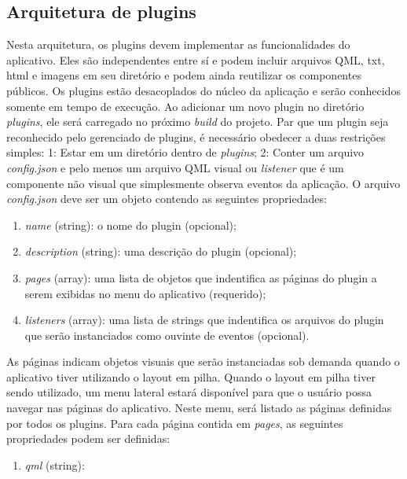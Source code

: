 \subsection{Arquitetura de plugins}
Nesta arquitetura, os plugins devem implementar as funcionalidades do aplicativo. Eles são independentes entre sí e podem incluir arquivos QML, txt, html e imagens em seu diretório e podem ainda reutilizar os componentes públicos. Os plugins estão desacoplados do núcleo da aplicação e serão conhecidos somente em tempo de execução. Ao adicionar um novo plugin no diretório \textit{plugins}, ele será carregado no próximo \textit{build} do projeto. Par que um plugin seja reconhecido pelo gerenciado de plugins, é necessário obedecer a duas restrições simples: 1: Estar em um diretório dentro de \textit{plugins}; 2: Conter um arquivo \textit{config.json} e pelo menos um arquivo QML visual ou \textit{listener} que é um componente não visual que simplesmente observa eventos da aplicação. O arquivo \textit{config.json} deve ser um objeto contendo as seguintes propriedades:  
\begin{enumerate}
	\item \textit{name} (string): o nome do plugin (opcional);
	\item \textit{description} (string): uma descrição do plugin (opcional);
	\item \textit{pages} (array): uma lista de objetos que indentifica as páginas do plugin a serem exibidas no menu do aplicativo (requerido);
	\item \textit{listeners} (array): uma lista de strings que indentifica os arquivos do plugin que serão instanciados como ouvinte de eventos (opcional).
\end{enumerate}
As páginas indicam objetos visuais que serão instanciadas sob demanda quando o aplicativo tiver utilizando o layout em pilha. Quando o layout em pilha tiver sendo utilizado, um menu lateral estará disponível para que o usuário possa navegar nas páginas do aplicativo. Neste menu, será listado as páginas definidas por todos os plugins. Para cada página contida em \textit{pages}, as seguintes propriedades podem ser definidas:
\begin{enumerate}
	\item \textit{qml} (string):
\end{enumerate}



